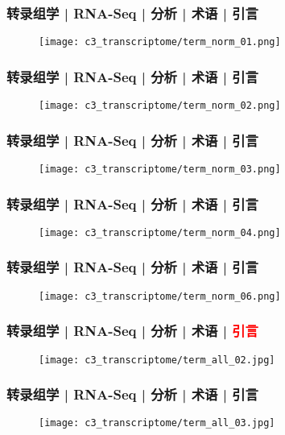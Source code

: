 \begin{frame}
  \frametitle{转录组学 | RNA-Seq | 分析 | 术语 | 引言}
  \begin{figure}
    \centering
    \texttt{[image: c3\_transcriptome/term\_norm\_01.png]}
  \end{figure}
\end{frame}

\begin{frame}
  \frametitle{转录组学 | RNA-Seq | 分析 | 术语 | 引言}
  \begin{figure}
    \centering
    \texttt{[image: c3\_transcriptome/term\_norm\_02.png]}
  \end{figure}
\end{frame}

\begin{frame}
  \frametitle{转录组学 | RNA-Seq | 分析 | 术语 | 引言}
  \begin{figure}
    \centering
    \texttt{[image: c3\_transcriptome/term\_norm\_03.png]}
  \end{figure}
\end{frame}

\begin{frame}
  \frametitle{转录组学 | RNA-Seq | 分析 | 术语 | 引言}
  \begin{figure}
    \centering
    \texttt{[image: c3\_transcriptome/term\_norm\_04.png]}
  \end{figure}
\end{frame}

\begin{frame}
  \frametitle{转录组学 | RNA-Seq | 分析 | 术语 | 引言}
  \begin{figure}
    \centering
    \texttt{[image: c3\_transcriptome/term\_norm\_06.png]}
  \end{figure}
\end{frame}

\begin{frame}
  \frametitle{转录组学 | RNA-Seq | 分析 | 术语 | \textcolor{red}{引言}}
  \begin{figure}
    \centering
    \texttt{[image: c3\_transcriptome/term\_all\_02.jpg]}
  \end{figure}
\end{frame}

\begin{frame}
  \frametitle{转录组学 | RNA-Seq | 分析 | 术语 | 引言}
  \begin{figure}
    \centering
    \texttt{[image: c3\_transcriptome/term\_all\_03.jpg]}
  \end{figure}
\end{frame}

